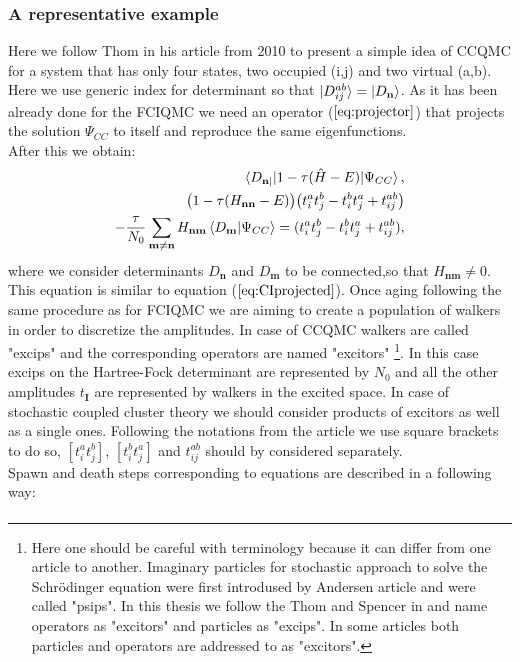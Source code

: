 \documentclass[twoside,english]{uiofysmaster}
\theoremstyle{definition}
\begin{document}
\subsubsection{A representative example}
Here we follow Thom in his article from 2010 \cite{thomStochasticCoupledCluster2010} to present a simple idea of CCQMC for a system that has only four states, two occupied (i,j) and two virtual (a,b). Here we use generic index for determinant so that $ \ket{D_{ij}^{ab}} = \ket{D_\textbf{n}} $.
As it has been already done for the FCIQMC we need an operator ($\ref{eq:projector}$) that projects the solution $\Psi_{CC}$ to itself and reproduce the same eigenfunctions.\\
After this we obtain:
\begin{align}
\braket{D_{\textbf{n}|}| 1-\tau (\hat{H}-E)|\Psi_{CC}}, \label{key} \\
\big(1-\tau(H_{\textbf{nn}}-E)\big)\big(t_i^a t_j^b-t_i^b t_j^a + t_{ij}^{ab}\big)  \nonumber \\
- \frac{\tau}{N_0} \sum_{\textbf{m} \neq \textbf{n}} H_{\textbf{nm}} \braket{D_{\textbf{m}}|\Psi_{CC}} = (t_i^a t_j^b-t_i^b t_j^a + t_{ij}^{ab}),
\end{align}
where we consider determinants $D_{\textbf{n}}$ and $D_{\textbf{m}}$ to be connected,so that  $H_\textbf{nm} \neq 0 $. This equation is similar to equation ($\ref{eq:CIprojected}$). Once aging following the same procedure as for FCIQMC we are aiming to create a population of walkers in order to discretize the amplitudes. In case of CCQMC walkers are called "excips" and the corresponding operators are named "excitors" \footnote{Here one should be careful with terminology because it can differ from one article to another. Imaginary particles for stochastic approach to solve the Schr\"{o}dinger equation were first introdused by Andersen article  \cite{andersonRandomWalkSimulation1975} and were called "psips". In this thesis we follow the Thom and Spencer in \cite{spencerDevelopmentsStochasticCoupled2016}  and name operators as "excitors" and particles as "excips". In some articles both particles and operators are addressed to as "excitors".}. In this case excips on the Hartree-Fock determinant are represented by $N_0$ and all the other amplitudes $t_{\textbf{I}}$ are represented by walkers in the excited space. In case of stochastic coupled cluster theory we should consider products of excitors as well as a single ones. Following the notations from the article we use square brackets to do so, $[t_i^a t_j^b ]$, $[t_i^b t_j^a ]$  and $t_{ij}^{ab}$ should by considered separately. \\
Spawn and death steps corresponding to equations are described in a following way:
\begin{align}
\end{align}
\end{document}
